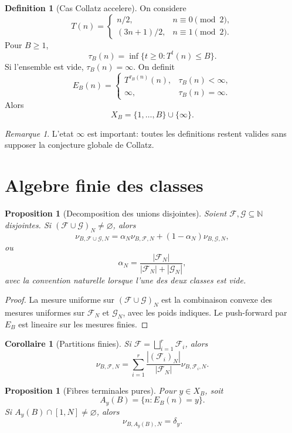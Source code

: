 \documentclass[11pt]{article}
\theoremstyle{plain}
\newtheorem{proposition}[theorem]{Proposition}
\newtheorem{corollary}[theorem]{Corollaire}
\theoremstyle{definition}
\newtheorem{definition}[theorem]{Definition}
\theoremstyle{remark}
\newtheorem{remark}[theorem]{Remarque}
\newcommand{\N}{\mathbb N}
\newcommand{\1}{\mathbf 1}
\newcommand{\F}{\mathcal F}
\newcommand{\G}{\mathcal G}
\begin{document}
\begin{definition}[Cas Collatz accelere]
On considere
\[
T(n)=
\begin{cases}
n/2,& n\equiv0\pmod2,\\
(3n+1)/2,& n\equiv1\pmod2.
\end{cases}
\]
Pour \(B\ge1\),
\[
\tau_B(n)=\inf\{t\ge0:T^t(n)\le B\}.
\]
Si l'ensemble est vide, \(\tau_B(n)=\infty\). On definit
\[
E_B(n)=
\begin{cases}
T^{\tau_B(n)}(n),& \tau_B(n)<\infty,\\
\infty,& \tau_B(n)=\infty.
\end{cases}
\]
Alors
\[
X_B=\{1,\ldots,B\}\cup\{\infty\}.
\]
\end{definition}

\begin{remark}
L'etat \(\infty\) est important: toutes les definitions restent valides sans
supposer la conjecture globale de Collatz.
\end{remark}

\section{Algebre finie des classes}

\begin{proposition}[Decomposition des unions disjointes]
Soient \(\F,\G\subseteq\N\) disjointes. Si
\((\F\cup\G)_N\ne\varnothing\), alors
\[
\nu_{B,\F\cup\G,N}
=
\alpha_N\nu_{B,\F,N}+(1-\alpha_N)\nu_{B,\G,N},
\]
ou
\[
\alpha_N=\frac{|\F_N|}{|\F_N|+|\G_N|},
\]
avec la convention naturelle lorsque l'une des deux classes est vide.
\end{proposition}

\begin{proof}
La mesure uniforme sur \((\F\cup\G)_N\) est la combinaison convexe des mesures
uniformes sur \(\F_N\) et \(\G_N\), avec les poids indiques. Le push-forward par
\(E_B\) est lineaire sur les mesures finies.
\end{proof}

\begin{corollary}[Partitions finies]
Si \(\F=\bigsqcup_{i=1}^r \F_i\), alors
\[
\nu_{B,\F,N}
=
\sum_{i=1}^r
\frac{|(\F_i)_N|}{|\F_N|}\nu_{B,\F_i,N}.
\]
\end{corollary}

\begin{proposition}[Fibres terminales pures]
Pour \(y\in X_B\), soit
\[
A_y(B)=\{n:E_B(n)=y\}.
\]
Si \(A_y(B)\cap[1,N]\ne\varnothing\), alors
\[
\nu_{B,A_y(B),N}=\delta_y.
\]
\end{proposition}
\end{document}

